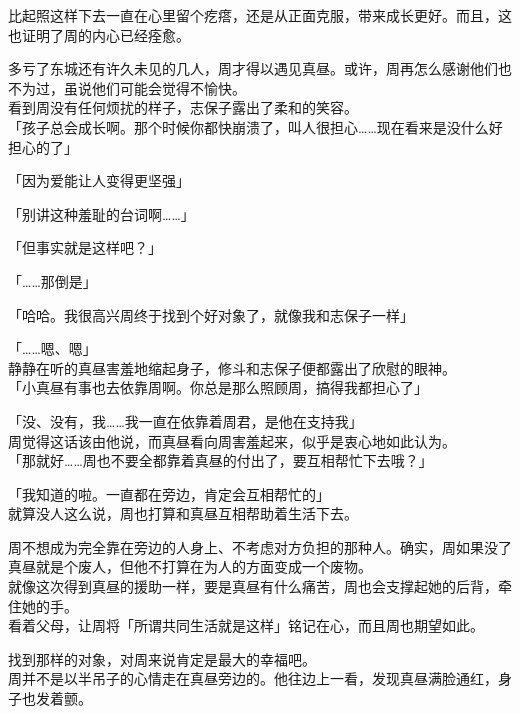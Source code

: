 比起照这样下去一直在心里留个疙瘩，还是从正面克服，带来成长更好。而且，这也证明了周的内心已经痊愈。

多亏了东城还有许久未见的几人，周才得以遇见真昼。或许，周再怎么感谢他们也不为过，虽说他们可能会觉得不愉快。\\

看到周没有任何烦扰的样子，志保子露出了柔和的笑容。\\

「孩子总会成长啊。那个时候你都快崩溃了，叫人很担心……现在看来是没什么好担心的了」

「因为爱能让人变得更坚强」

「别讲这种羞耻的台词啊……」

「但事实就是这样吧？」

「……那倒是」

「哈哈。我很高兴周终于找到个好对象了，就像我和志保子一样」

「……嗯、嗯」\\

静静在听的真昼害羞地缩起身子，修斗和志保子便都露出了欣慰的眼神。\\

「小真昼有事也去依靠周啊。你总是那么照顾周，搞得我都担心了」

「没、没有，我……我一直在依靠着周君，是他在支持我」\\

周觉得这话该由他说，而真昼看向周害羞起来，似乎是衷心地如此认为。\\

「那就好……周也不要全都靠着真昼的付出了，要互相帮忙下去哦？」

「我知道的啦。一直都在旁边，肯定会互相帮忙的」\\

就算没人这么说，周也打算和真昼互相帮助着生活下去。

周不想成为完全靠在旁边的人身上、不考虑对方负担的那种人。确实，周如果没了真昼就是个废人，但他不打算在为人的方面变成一个废物。\\

就像这次得到真昼的援助一样，要是真昼有什么痛苦，周也会支撑起她的后背，牵住她的手。\\

看着父母，让周将「所谓共同生活就是这样」铭记在心，而且周也期望如此。

找到那样的对象，对周来说肯定是最大的幸福吧。\\

周并不是以半吊子的心情走在真昼旁边的。他往边上一看，发现真昼满脸通红，身子也发着颤。

